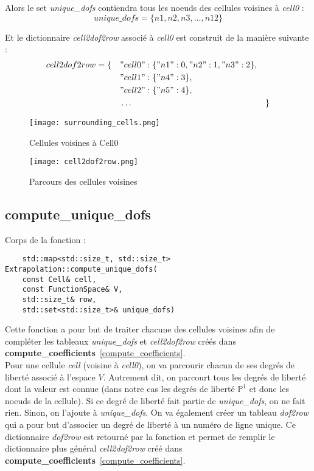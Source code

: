 Alors le set \textit{unique\_dofs} contiendra tous les noeuds des cellules voisines à \textit{cell0} : 
$$unique\_dofs = \{n1,n2,n3,\dots,n12\}$$

Et le dictionnaire \textit{cell2dof2row} associé à \textit{cell0} est construit de la manière suivante :
$$cell2dof2row = \begin{aligned}[t]
	\{\quad&"cell0":\{"n1":0,"n2":1,"n3":2\},&& \\
	&"cell1":\{"n4":3\}, \\
	&"cell2":\{"n5":4\}, \\
	&\dots &&\}
\end{aligned}$$

\begin{minipage}{0.48\linewidth}
	\begin{figure}[H]
		\centering
		\texttt{[image: surrounding\_cells.png]}
		\caption{Cellules voisines à Cell0}
		\label{fig3}
	\end{figure}
\end{minipage}
\begin{minipage}{0.48\linewidth}
	\begin{figure}[H]
		\centering
		\texttt{[image: cell2dof2row.png]}
		\caption{Parcours des cellules voisines}
		\label{fig4}
	\end{figure}
\end{minipage}


\subsection{compute\_unique\_dofs}
\label{compute_unique_dofs}

Corps de la fonction :

\begin{lstlisting}
	std::map<std::size_t, std::size_t> Extrapolation::compute_unique_dofs(
	const Cell& cell,
	const FunctionSpace& V,
	std::size_t& row,
	std::set<std::size_t>& unique_dofs)
\end{lstlisting}

Cette fonction a pour but de traiter chacune des cellules voisines afin de compléter les tableaux \textit{unique\_dofs} et \textit{cell2dof2row} créés dans \textbf{compute\_coefficients}~\ref{compute_coefficients}.\\

Pour une cellule \textit{cell} (voisine à \textit{cell0}), on va parcourir chacun de ses degrés de liberté associé à l'espace $V$. Autrement dit, on parcourt tous les degrés de liberté dont la valeur est connue (dans notre cas les degrés de liberté $\mathbb{P}^1$ et donc les noeuds de la cellule). Si ce degré de liberté fait partie de \textit{unique\_dofs}, on ne fait rien. Sinon, on l'ajoute à \textit{unique\_dofs}. On va également créer un tableau \textit{dof2row} qui a pour but d'associer un degré de liberté à un numéro de ligne unique. Ce dictionnaire \textit{dof2row} est retourné par la fonction et permet de remplir le dictionnaire plus général \textit{cell2dof2row} créé dans \textbf{compute\_coefficients}~\ref{compute_coefficients}.

